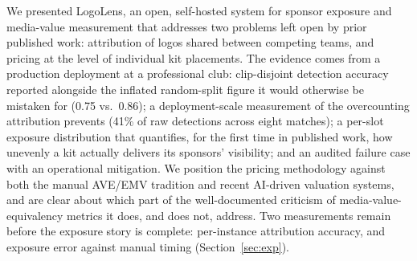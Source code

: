 \documentclass[conference,a4paper]{IEEEtran}
\begin{document}
We presented LogoLens, an open, self-hosted system for sponsor exposure and
media-value measurement that addresses two problems left open by prior published work:
attribution of logos shared between competing teams, and pricing at the level of
individual kit placements. The evidence comes from a production deployment at a
professional club: clip-disjoint detection accuracy reported alongside the inflated
random-split figure it would otherwise be mistaken for (0.75 vs.\ 0.86); a
deployment-scale measurement of the overcounting attribution prevents (41\% of raw
detections across eight matches); a per-slot exposure distribution that quantifies,
for the first time in published work, how unevenly a kit actually delivers its
sponsors' visibility; and an audited failure case with an operational mitigation. We
position the pricing methodology against both the manual AVE/EMV tradition
and recent AI-driven valuation systems, and are clear about which part of the
well-documented criticism of media-value-equivalency metrics it does, and does not,
address. Two measurements remain before the exposure story is complete: per-instance
attribution accuracy, and exposure error against manual timing (Section~\ref{sec:exp}).



\end{document}
